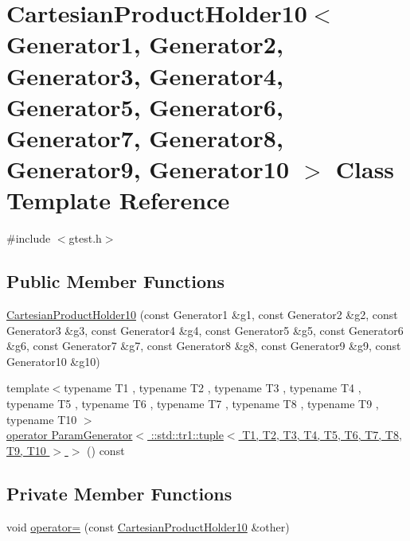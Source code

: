 \hypertarget{classtesting_1_1internal_1_1CartesianProductHolder10}{\section{\-Cartesian\-Product\-Holder10$<$ \-Generator1, \-Generator2, \-Generator3, \-Generator4, \-Generator5, \-Generator6, \-Generator7, \-Generator8, \-Generator9, \-Generator10 $>$ \-Class \-Template \-Reference}
\label{db/df3/classtesting_1_1internal_1_1CartesianProductHolder10}
}


{\ttfamily \#include $<$gtest.\-h$>$}

\subsection*{\-Public \-Member \-Functions}
\begin{DoxyCompactItemize}
\item 
\hyperlink{classtesting_1_1internal_1_1CartesianProductHolder10_aa325e8973cc33afa317fc7868f03e6f9}{\-Cartesian\-Product\-Holder10} (const \-Generator1 \&g1, const \-Generator2 \&g2, const \-Generator3 \&g3, const \-Generator4 \&g4, const \-Generator5 \&g5, const \-Generator6 \&g6, const \-Generator7 \&g7, const \-Generator8 \&g8, const \-Generator9 \&g9, const \-Generator10 \&g10)
\item 
{\footnotesize template$<$typename T1 , typename T2 , typename T3 , typename T4 , typename T5 , typename T6 , typename T7 , typename T8 , typename T9 , typename T10 $>$ }\\\hyperlink{classtesting_1_1internal_1_1CartesianProductHolder10_ad072971434ee9564985f9cc4936c5606}{operator Param\-Generator$<$ \-::std\-::tr1\-::tuple$<$ T1, T2, T3, T4, T5, T6, T7, T8, T9, T10 $>$ $>$} () const 
\end{DoxyCompactItemize}
\subsection*{\-Private \-Member \-Functions}
\begin{DoxyCompactItemize}
\item 
void \hyperlink{classtesting_1_1internal_1_1CartesianProductHolder10_a20a3bc551201685efde9b387a711e97f}{operator=} (const \hyperlink{classtesting_1_1internal_1_1CartesianProductHolder10}{\-Cartesian\-Product\-Holder10} \&other)
\end{DoxyCompactItemize}
